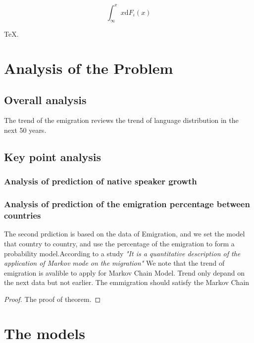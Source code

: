 \documentclass{mcmthesis}
\begin{document}
\begin{Theorem} \label{thm:latex}
\begin{equation}\int^x_\infty x \mathrm{d}F_\iota(x)
\end{equation}
\end{Theorem}
\begin{Lemma} \label{thm:tex}
\TeX .
\end{Lemma}
\section{Analysis of the Problem}
\subsection{Overall analysis}

The trend of the emigration reviews the trend of language distribution in the next 50 years.

\subsection{Key point analysis}
\subsubsection{Analysis of prediction of native speaker growth}

\subsubsection{Analysis of prediction of the emigration percentage between countries}
The second prdiction is based on the data of Emigration, and we set the model that country to country, and use the percentage of the emigration to 
form a probability model.According to a study\cite{tec} \emph{"It is a quantitative description of the application of Markov
mode on the migration"} We note that the trend of emigration is avalible to apply for Markov Chain Model. Trend only depand on the next data but not earlier. 
The emmigration should satisfy the Markov Chain

\begin{proof}
The proof of theorem.
\end{proof}
\section{The models}
\end{document}
